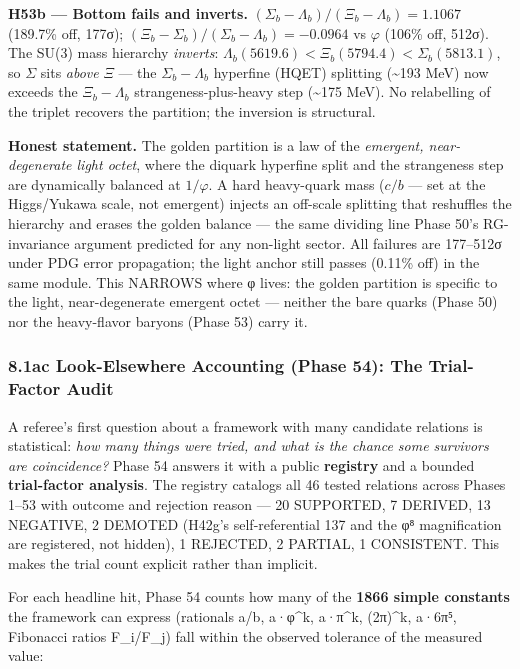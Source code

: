 \documentclass[
]{article}
\begin{document}
\textbf{H53b --- Bottom fails and inverts.}
\((\Sigma_b-\Lambda_b)/(\Xi_b-\Lambda_b) = 1.1067\) (189.7\% off, 177σ);
\((\Xi_b-\Sigma_b)/(\Sigma_b-\Lambda_b) = -0.0964\) vs \(\varphi\)
(106\% off, 512σ). The SU(3) mass hierarchy \emph{inverts}:
\(\Lambda_b(5619.6) < \Xi_b(5794.4) < \Sigma_b(5813.1)\), so \(\Sigma\)
sits \emph{above} \(\Xi\) --- the \(\Sigma_b-\Lambda_b\) hyperfine
(HQET) splitting (\textasciitilde193 MeV) now exceeds the
\(\Xi_b-\Lambda_b\) strangeness-plus-heavy step (\textasciitilde175
MeV). No relabelling of the triplet recovers the partition; the
inversion is structural.

\textbf{Honest statement.} The golden partition is a law of the
\emph{emergent, near-degenerate light octet}, where the diquark
hyperfine split and the strangeness step are dynamically balanced at
\(1/\varphi\). A hard heavy-quark mass (\(c/b\) --- set at the
Higgs/Yukawa scale, not emergent) injects an off-scale splitting that
reshuffles the hierarchy and erases the golden balance --- the same
dividing line Phase 50's RG-invariance argument predicted for any
non-light sector. All failures are 177--512σ under PDG error
propagation; the light anchor still passes (0.11\% off) in the same
module. This NARROWS where φ lives: the golden partition is specific to
the light, near-degenerate emergent octet --- neither the bare quarks
(Phase 50) nor the heavy-flavor baryons (Phase 53) carry it.

\subsubsection{8.1ac Look-Elsewhere Accounting (Phase 54): The
Trial-Factor
Audit}\label{ac-look-elsewhere-accounting-phase-54-the-trial-factor-audit}

A referee's first question about a framework with many candidate
relations is statistical: \emph{how many things were tried, and what is
the chance some survivors are coincidence?} Phase 54 answers it with a
public \textbf{registry} and a bounded \textbf{trial-factor analysis}.
The registry catalogs all 46 tested relations across Phases 1--53 with
outcome and rejection reason --- 20 SUPPORTED, 7 DERIVED, 13 NEGATIVE, 2
DEMOTED (H42g's self-referential 137 and the φ⁸ magnification are
registered, not hidden), 1 REJECTED, 2 PARTIAL, 1 CONSISTENT. This makes
the trial count explicit rather than implicit.

For each headline hit, Phase 54 counts how many of the \textbf{1866
simple constants} the framework can express (rationals a/b, a·φ\^{}k,
a·π\^{}k, (2π)\^{}k, a·6π⁵, Fibonacci ratios F\_i/F\_j) fall within the
observed tolerance of the measured value:
\end{document}
